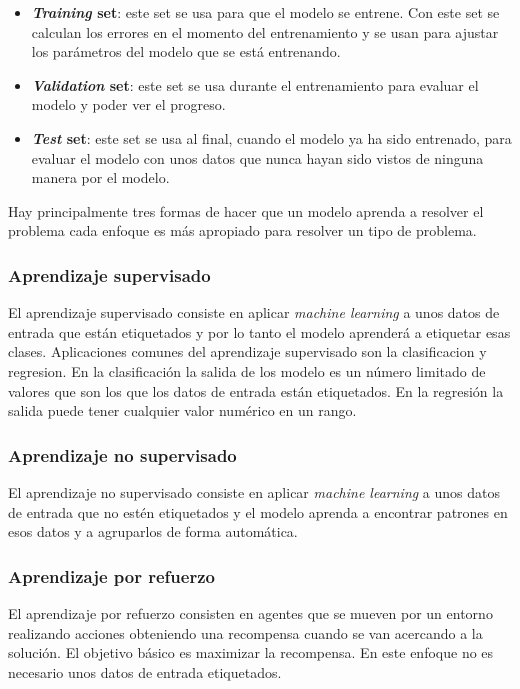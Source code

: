 \documentclass[12pt,a4paper]{article}
\begin{document}
\begin{itemize}
\item \textbf{\textit{Training} set}: este set se usa para que el modelo se entrene. Con este set se calculan los errores en el momento del entrenamiento y se usan para ajustar los parámetros del modelo que se está entrenando.
\item \textbf{\textit{Validation} set}: este set se usa durante el entrenamiento para evaluar el modelo y poder ver el progreso.
\item \textbf{\textit{Test} set}: este set se usa al final, cuando el modelo ya ha sido entrenado, para evaluar el modelo con unos datos que nunca hayan sido vistos de ninguna manera por el modelo.
\end{itemize}

Hay principalmente tres formas de hacer que un modelo aprenda a resolver el problema cada enfoque es más apropiado para resolver un tipo de problema.

\subsubsection{Aprendizaje supervisado}
El aprendizaje supervisado consiste en aplicar \textit{machine learning} a unos datos de entrada que están etiquetados y por lo tanto el modelo aprenderá a etiquetar esas clases. Aplicaciones comunes del aprendizaje supervisado son la clasificacion y regresion. En la clasificación la salida de los modelo es un número limitado de valores que son los que los datos de entrada están etiquetados. En la regresión la salida puede tener cualquier valor numérico en un rango.

\subsubsection{Aprendizaje no supervisado}
El aprendizaje no supervisado consiste en aplicar \textit{machine learning} a unos datos de entrada que no estén etiquetados y el modelo aprenda a encontrar patrones en esos datos y a agruparlos de forma automática.

\subsubsection{Aprendizaje por refuerzo}
El aprendizaje por refuerzo consisten en agentes que se mueven por un entorno realizando acciones obteniendo una recompensa cuando se van acercando a la solución. El objetivo básico es maximizar la recompensa. En este enfoque no es necesario unos datos de entrada etiquetados.
\end{document}
